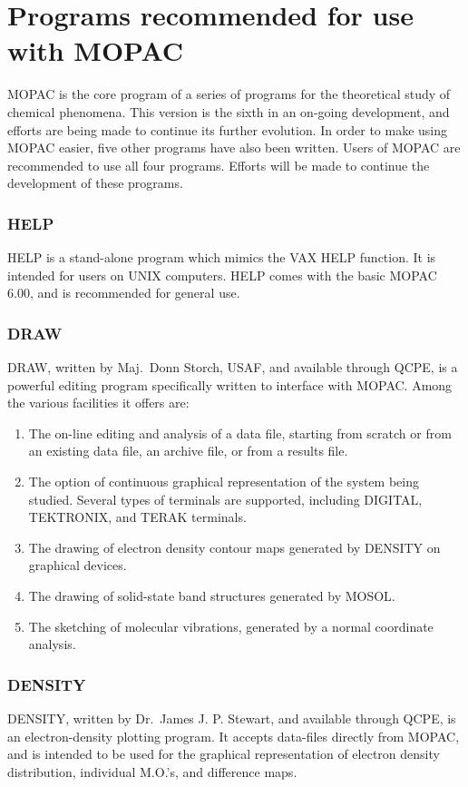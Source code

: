 \documentclass[a4paper]{book}
\newcommand{\mi}[1]{#1\index{#1}}
\begin{document}
\section{Programs recommended for use with MOPAC}
   MOPAC is the core program of a series of  programs  for  the  theoretical
   study  of  chemical  phenomena.  This version is the sixth in an on-going
   development,  and  efforts  are  being  made  to  continue  its   further
   evolution.  In order to make using MOPAC easier, five other programs have
   also been written.  Users of  MOPAC  are  recommended  to  use  all  four
   programs.   Efforts  will  be  made  to continue the development of these
   programs.
  
\subsubsection{HELP}
  HELP is a stand-alone program which mimics the  \mi{VAX}  HELP  function.
  It is intended for users on UNIX computers. \mi{HELP} comes with the basic
  MOPAC 6.00, and is recommended for general use.

\subsubsection{DRAW}
   DRAW, written by Maj.\ Donn Storch, USAF, 
   and available through QCPE,
   is  a  powerful  editing  program  specifically written to interface with
   MOPAC.  Among the various facilities it offers are:
\begin{enumerate}
\item The on-line editing and analysis of a data file,  starting  from
scratch  or from an existing data file, an archive file, or from
a results file.
\item The option of continuous graphical representation of the  system
being  studied.   Several  types  of  terminals  are  supported,
including DIGITAL, TEKTRONIX, and TERAK terminals.
\item The drawing  of  electron  density  contour  maps  generated  by
DENSITY on graphical devices.
\item The drawing of solid-state band structures generated by MOSOL.
\item The sketching of molecular vibrations,  generated  by  a  normal
coordinate analysis.
\end{enumerate}

\subsubsection{DENSITY}
   \mi{DENSITY}, written by Dr.\ James J. P. Stewart, and available  through
   QCPE,  is  an  electron-density  plotting program.  It accepts data-files
   directly from MOPAC, and  is  intended  to  be  used  for  the  graphical
   representation  of  electron density distribution, individual M.O.'s, and
   difference maps.
        
\end{document}
